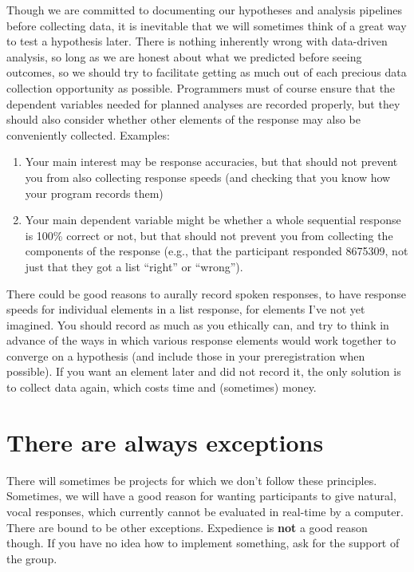 \documentclass[
  12pt,
]{book}
\begin{document}
Though we are committed to documenting our hypotheses and analysis pipelines before collecting data, it is inevitable that we will sometimes think of a great way to test a hypothesis later. There is nothing inherently wrong with data-driven analysis, so long as we are honest about what we predicted before seeing outcomes, so we should try to facilitate getting as much out of each precious data collection opportunity as possible. Programmers must of course ensure that the dependent variables needed for planned analyses are recorded properly, but they should also consider whether other elements of the response may also be conveniently collected. Examples:

\begin{enumerate}
\def\labelenumi{\arabic{enumi}.}
\item
  Your main interest may be response accuracies, but that should not prevent you from also collecting response speeds (and checking that you know how your program records them)
\item
  Your main dependent variable might be whether a whole sequential response is 100\% correct or not, but that should not prevent you from collecting the components of the response (e.g., that the participant responded 8675309, not just that they got a list ``right'' or ``wrong'').
\end{enumerate}

There could be good reasons to aurally record spoken responses, to have response speeds for individual elements in a list response, for elements I've not yet imagined. You should record as much as you ethically can, and try to think in advance of the ways in which various response elements would work together to converge on a hypothesis (and include those in your preregistration when possible). If you want an element later and did not record it, the only solution is to collect data again, which costs time and (sometimes) money.

\section{There are always exceptions}\label{there-are-always-exceptions}

There will sometimes be projects for which we don't follow these principles. Sometimes, we will have a good reason for wanting participants to give natural, vocal responses, which currently cannot be evaluated in real-time by a computer. There are bound to be other exceptions. Expedience is \textbf{not} a good reason though. If you have no idea how to implement something, ask for the support of the group.
\end{document}
